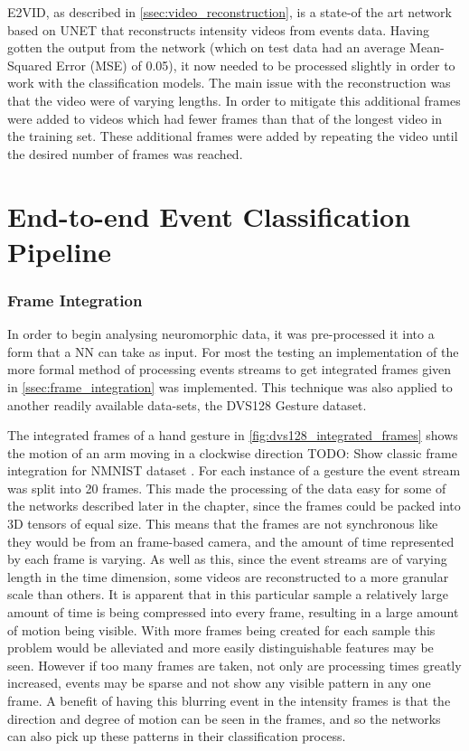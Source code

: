 E2VID, as described in \cref{ssec:video_reconstruction}, is a state-of the art network based on UNET that reconstructs intensity videos from events data. Having gotten the output from the network (which on test data had an average Mean-Squared Error (MSE) of 0.05), it now needed to be processed slightly in order to work with the classification models. The main issue with the reconstruction was that the video were of varying lengths. In order to mitigate this additional frames were added to videos which had fewer frames than that of the longest video in the training set. These additional frames were added by repeating the video until the desired number of frames was reached.

\color{black}

\section{End-to-end Event Classification Pipeline}

\subsubsection{Frame Integration}

In order to begin analysing neuromorphic data, it was pre-processed it into a form that a NN can take as input. For most the testing an implementation of the more formal method of processing events streams to get integrated frames given in \cref{ssec:frame_integration} was implemented. This technique was also applied to another readily available data-sets, the DVS128 Gesture dataset.

The integrated frames of a hand gesture in \cref{fig:dvs128_integrated_frames} shows the motion of an arm moving in a clockwise direction \color{red} TODO: Show classic frame integration for NMNIST dataset \color{black}. For each instance of a gesture the event stream was split into 20 frames. This made the processing of the data easy for some of the networks described later in the chapter, since the frames could be packed into 3D tensors of equal size. This means that the frames are not synchronous like they would be from an frame-based camera, and the amount of time represented by each frame is varying. As well as this, since the event streams are of varying length in the time dimension, some videos are reconstructed to a more granular scale than others. It is apparent that in this particular sample a relatively large amount of time is being compressed into every frame, resulting in a large amount of motion being visible. With more frames being created for each sample this problem would be alleviated and more easily distinguishable features may be seen. However if too many frames are taken, not only are processing times greatly increased, events may be sparse and not show any visible pattern in any one frame. A benefit of having this blurring event in the intensity frames is that the direction and degree of motion can be seen in the frames, and so the networks can also pick up these patterns in their classification process.

